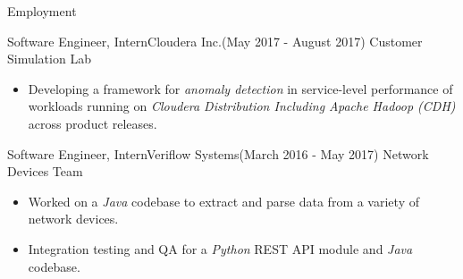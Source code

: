 \documentclass[]{Gohar_CV_Jobs}
\begin{document}
    \makeheader
    
    \begin{cvsection}{Employment}
    	\begin{cvsubsection}{Software Engineer, Intern}{Cloudera Inc.}{{\normalfont (May 2017 - August 2017)}}
            Customer Simulation Lab
            \begin{itemize}
                \item Developing a framework for \textit{anomaly detection} in service-level performance of workloads running on \textit{Cloudera Distribution Including Apache Hadoop (CDH)} across product releases.
            \end{itemize}
        \end{cvsubsection}
        \begin{cvsubsection}{Software Engineer, Intern}{Veriflow Systems}{{\normalfont (March 2016 - May 2017)}}
            Network Devices Team
            \begin{itemize}
                \item Worked on a \textit{Java} codebase to extract and parse data from a variety of network devices.
                \item Integration testing and QA for a \textit{Python} REST API module and \textit{Java} codebase.
            \end{itemize}
        \end{cvsubsection}
    \end{cvsection}
\end{document}
